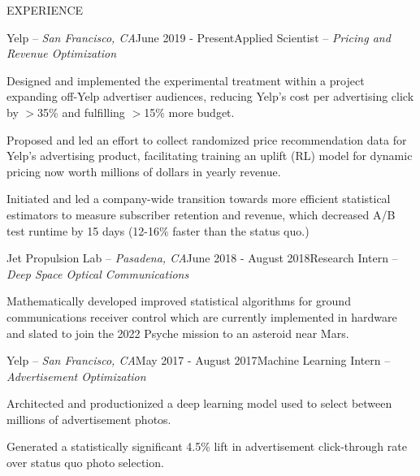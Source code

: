 \documentclass{resume} %
\begin{document}
 

\vspace{-1em}
\begin{rSection}{EXPERIENCE}

\begin{rSubsection}{Yelp -- {\it San Francisco, CA}}{June 2019 - Present}{Applied Scientist -- {\sl Pricing and Revenue Optimization}}

\item Designed and implemented the experimental treatment within a project expanding off-Yelp advertiser audiences, reducing Yelp's cost per advertising click by $>$35\% and fulfilling $>$15\% more budget.

\item Proposed and led an effort to collect randomized price recommendation data for Yelp's advertising product, facilitating training an uplift (RL) model for dynamic pricing now worth millions of dollars in yearly revenue.

\item Initiated and led a company-wide transition towards more efficient statistical estimators to measure subscriber retention and revenue, which decreased A/B test runtime by 15 days (12-16\% faster than the status quo.)

\end{rSubsection}

\begin{rSubsection}{Jet Propulsion Lab -- {\it Pasadena, CA}}{June 2018 - August 2018}{Research Intern -- {\sl Deep Space Optical Communications}}

\item Mathematically developed improved statistical algorithms for ground communications receiver control which are currently implemented in hardware and slated to join the 2022 Psyche mission to an asteroid near Mars.
\end{rSubsection}

\begin{rSubsection}{Yelp -- {\it San Francisco, CA}}{May 2017 - August 2017}{Machine Learning Intern -- {\sl Advertisement Optimization}}

\item Architected and productionized a deep learning model used to select between millions of advertisement photos.
\item Generated a statistically significant 4.5\% lift in advertisement click-through rate over status quo photo selection.
\end{rSubsection}


\end{rSection}
\end{document}
